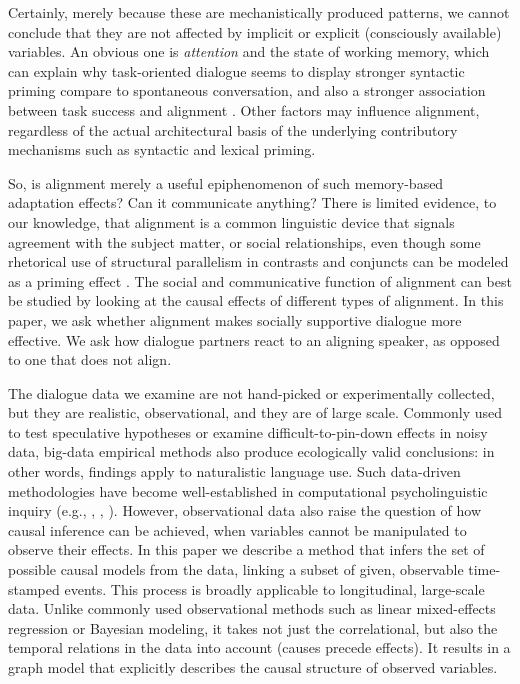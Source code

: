 \documentclass[man,biblatex,floatsintext]{apa6}
\begin{document}
Certainly, merely because these are mechanistically produced patterns, we cannot conclude that they are not affected by implicit or explicit (consciously available) variables.  An obvious one is \emph{attention} and the state of working memory, which can explain why task-oriented dialogue seems to display stronger syntactic priming compare to spontaneous conversation, and also a stronger association between task success and alignment \parencite{reitter_alignment_2014}. Other factors may influence alignment, regardless of the actual architectural basis of the underlying contributory mechanisms such as syntactic and lexical priming.

So, is alignment merely a useful epiphenomenon of such memory-based adaptation effects?  Can it communicate anything? There is limited evidence, to our knowledge, that alignment is a common linguistic device that signals agreement with the subject matter, or social relationships, even though some rhetorical use of structural parallelism in contrasts and conjuncts \parencite{aristotle2015rhetoric} can be modeled as a priming effect \parencite{dubey2008probabilistic}.  The social and communicative function of alignment can best be studied by looking at the causal effects of different types of alignment.  In this paper, we ask whether alignment makes socially supportive dialogue more effective.  We ask how dialogue partners react to an aligning speaker, as opposed to one that does not align.

The dialogue data we examine are not hand-picked or experimentally collected, but they are realistic, observational, and they are of large scale.  Commonly used to test speculative hypotheses or examine difficult-to-pin-down effects in noisy data, big-data empirical methods also produce ecologically valid conclusions: in other words, findings apply to naturalistic language use.  Such data-driven methodologies have become well-established in computational psycholinguistic inquiry (e.g., \cite{gries2005corpusbased}, \cite{jaeger2006speakers}, \cite{reitter2017alignment}).  However, observational data also raise the question of how causal inference can be achieved, when variables cannot be manipulated to observe their effects. In this paper we describe a method that infers  the set of possible causal models from the data, linking a subset of given, observable time-stamped events.    This process is broadly applicable to longitudinal, large-scale data.  Unlike commonly used observational methods such as linear mixed-effects regression or Bayesian modeling, it takes not just the correlational, but also the temporal relations in the data into account (causes precede effects).   It results in a graph model that explicitly describes the causal structure of observed variables.
\end{document}
